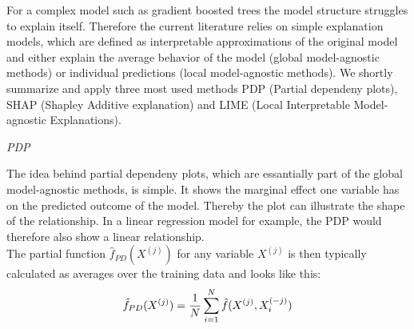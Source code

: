 \documentclass[12pt,titlepage]{article}
\begin{document}
For a complex model such as gradient boosted trees the model structure struggles to explain itself. Therefore the current literature relies on simple explanation models, which are defined as interpretable approximations of the original model and either explain the average behavior of the model (global model-agnostic methods) or individual predictions (local model-agnostic methods). We shortly summarize and apply three most used methods PDP (Partial dependeny plots), SHAP (Shapley Additive explanation) and LIME (Local Interpretable Model-agnostic Explanations).

\vspace{3mm}

\textit{PDP}

\vspace{3mm}
The idea behind partial dependeny plots, which are essantially part of the global model-agnostic methods, is simple. It shows the marginal effect one variable has on the predicted outcome of the model. Thereby the plot can illustrate the shape of the relationship. In a linear regression model for example, the PDP would therefore also show a linear relationship. \\
The partial function $\hat{f}_{PD}(X^{(j)})$ for any variable $X^{(j)}$ is then typically calculated as averages over the training data and looks like this: \\

\begin{equation} \label{pdp}
    \hat{f}_{PD}(X^{(j)}) = \frac{1}{N} \sum_{i=1}^{N} \hat{f}(X^{(j)}, X^{(-j)}_{i}) \\
\end{equation}
\end{document}
